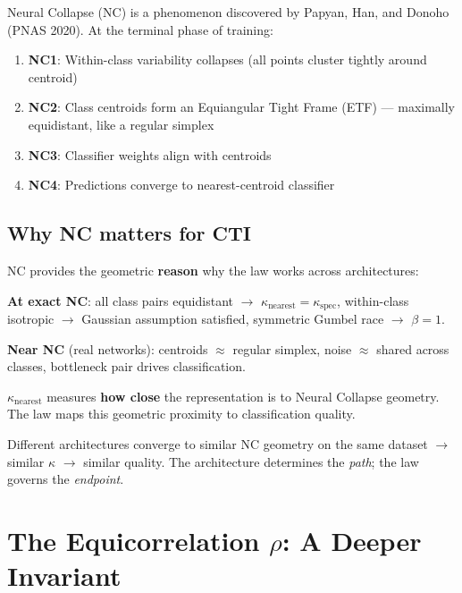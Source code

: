 \documentclass[11pt,a4paper]{article}
\begin{document}
Neural Collapse (NC) is a phenomenon discovered by Papyan, Han, and Donoho (PNAS 2020). At the terminal phase of training:

\begin{keybox}
\begin{enumerate}[nosep]
\item \textbf{NC1}: Within-class variability collapses (all points cluster tightly around centroid)
\item \textbf{NC2}: Class centroids form an Equiangular Tight Frame (ETF) --- maximally equidistant, like a regular simplex
\item \textbf{NC3}: Classifier weights align with centroids
\item \textbf{NC4}: Predictions converge to nearest-centroid classifier
\end{enumerate}
\end{keybox}

\subsection{Why NC matters for CTI}

NC provides the geometric \textbf{reason} why the law works across architectures:

\textbf{At exact NC}: all class pairs equidistant $\to$ $\kappa_\mathrm{nearest} = \kappa_\mathrm{spec}$, within-class isotropic $\to$ Gaussian assumption satisfied, symmetric Gumbel race $\to$ $\beta = 1$.

\textbf{Near NC} (real networks): centroids $\approx$ regular simplex, noise $\approx$ shared across classes, bottleneck pair drives classification.

\begin{keybox}
$\kappa_\mathrm{nearest}$ measures \textbf{how close} the representation is to Neural Collapse geometry. The law maps this geometric proximity to classification quality.

Different architectures converge to similar NC geometry on the same dataset $\to$ similar $\kappa$ $\to$ similar quality. The architecture determines the \emph{path}; the law governs the \emph{endpoint}.
\end{keybox}

\section{The Equicorrelation $\rho$: A Deeper Invariant}
\end{document}
